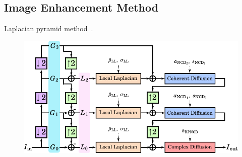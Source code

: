 \subsection{Image Enhancement Method}
Laplacian pyramid method~\cite{zhang_multiscale_2006, zhang_nonlinear_2007, kang_new_2016}.

%
\begin{figure}
  \centering
  \includegraphics[scale=1.0]{figures/multiscale_filter.pdf}
  \caption{}
\end{figure}

